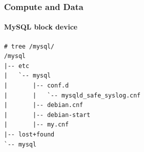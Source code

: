 \begin{frame}[fragile]
\frametitle{Compute and Data}
\framesubtitle{MySQL block device}
\begin{lstlisting}
# tree /mysql/
/mysql
|-- etc
|   `-- mysql
|       |-- conf.d
|       |   `-- mysqld_safe_syslog.cnf
|       |-- debian.cnf
|       |-- debian-start
|       |-- my.cnf
|-- lost+found
`-- mysql
\end{lstlisting}
\end{frame}
